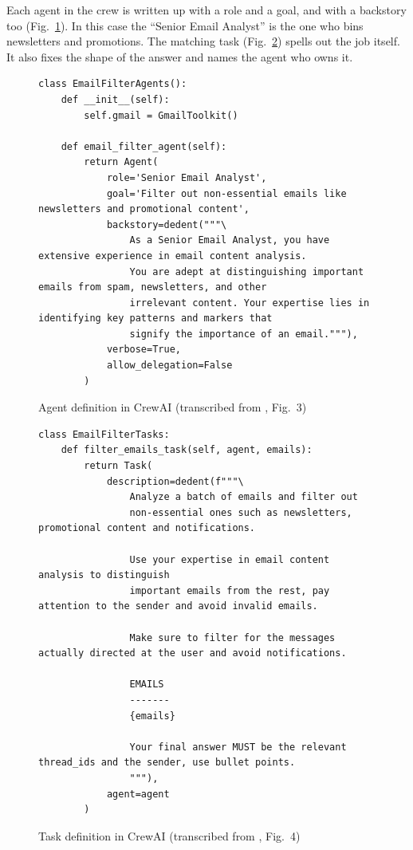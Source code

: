 \documentclass[12pt,a4paper]{report}
\begin{document}
Each agent in the crew is written up with a role and a goal, and with a backstory too (Fig.~\ref{fig:agent}). In this case the ``Senior Email Analyst'' is the one who bins newsletters and promotions. The matching task (Fig.~\ref{fig:task}) spells out the job itself. It also fixes the shape of the answer and names the agent who owns it.

\begin{figure}[H]
\begin{lstlisting}
class EmailFilterAgents():
    def __init__(self):
        self.gmail = GmailToolkit()

    def email_filter_agent(self):
        return Agent(
            role='Senior Email Analyst',
            goal='Filter out non-essential emails like newsletters and promotional content',
            backstory=dedent("""\
                As a Senior Email Analyst, you have extensive experience in email content analysis.
                You are adept at distinguishing important emails from spam, newsletters, and other
                irrelevant content. Your expertise lies in identifying key patterns and markers that
                signify the importance of an email."""),
            verbose=True,
            allow_delegation=False
        )
\end{lstlisting}
\caption{Agent definition in CrewAI (transcribed from \cite{duan2024langgraphcrewai}, Fig.~3)}
\label{fig:agent}
\end{figure}

\begin{figure}[H]
\begin{lstlisting}
class EmailFilterTasks:
    def filter_emails_task(self, agent, emails):
        return Task(
            description=dedent(f"""\
                Analyze a batch of emails and filter out
                non-essential ones such as newsletters, promotional content and notifications.

                Use your expertise in email content analysis to distinguish
                important emails from the rest, pay attention to the sender and avoid invalid emails.

                Make sure to filter for the messages actually directed at the user and avoid notifications.

                EMAILS
                -------
                {emails}

                Your final answer MUST be the relevant thread_ids and the sender, use bullet points.
                """),
            agent=agent
        )
\end{lstlisting}
\caption{Task definition in CrewAI (transcribed from \cite{duan2024langgraphcrewai}, Fig.~4)}
\label{fig:task}
\end{figure}
\end{document}
